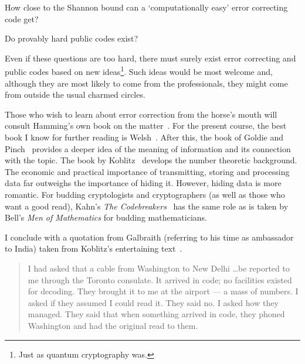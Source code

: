 How close to the Shannon bound can a
`computationally easy' error correcting code
get?

Do provably hard public codes exist?

Even if these questions are too hard, there
must surely exist error correcting and public
codes based on new ideas\footnote{Just as quantum
cryptography was.}. Such ideas would
be most welcome
and, although they are most likely to come
from the professionals, they might come
from outside the usual charmed circles.

Those who wish to learn about error correction
from the horse's mouth will consult Hamming's
own book on the matter~\cite{Hamming}.
For the present course,
the best book I know for further reading
is  Welsh~\cite{Welsh}. After this,
the book of Goldie and Pinch~\cite{Pinch} provides
a deeper idea of the meaning of information
and its connection with the topic. The book by
Koblitz~\cite{Koblitz} develops the number theoretic
background.
The economic and practical importance of
transmitting, storing and processing data
far outweighs the importance of hiding it.
However, hiding data is more romantic.
For budding cryptologists and cryptographers
(as well as those who want a good read),
Kahn's \emph{The Codebreakers}~\cite{Kahn Code}
has the same role as is taken by Bell's
\emph{Men of Mathematics}
for budding mathematicians.


I conclude with a quotation from Galbraith
(referring to his time as ambassador to India)
taken from Koblitz's entertaining text~\cite{Koblitz}.
\begin{quotation}
I had asked that a cable from Washington to New Delhi
\dots be reported to me through the Toronto consulate.
It arrived in code; no facilities existed for decoding.
They brought it to me at the airport --- a mass of
numbers. I asked if they assumed I could read it.
They said no. I asked how they managed.
They said that when something arrived in code,
they phoned Washington and had the original
read to them.
\end{quotation}

